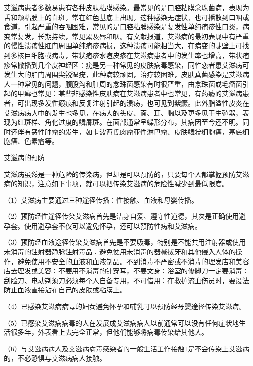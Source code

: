 \documentclass[12pt,UTF8]{ctexbook}
\begin{document}
艾滋病患者多数易患有各种皮肤粘膜感染。最常见的是口腔粘膜念珠菌病，表现为舌和颊粘膜上的白斑，常在红色基底上出现，这种感染无症状，也可播散到口咽或食道，引起严重的吞咽困难，常见的是口腔粘膜感染是复发性单纯疱疹性口炎，病变常复发，长期持续，常见累及唇和咽。有文献报道，艾滋病的最初表现中有严重的慢性溃疡性肛门周围单纯疱疹病损，这种溃疡可能相当大，在病变的陡壁上可找到多核巨细胞或病毒，带状疱疹水痘皮疹在艾滋病患者中的发生率也增高，带状疱疹常撒播到几个皮神经区：疣是另一种常见的皮肤病毒感染，同性恋者患艾滋病可发生大的肛门周围尖锐湿疣，此种病较顽固，治疗较困难，皮肤真菌感染是艾滋病人一种常见的问题，腹股沟和肛周的念珠菌感染有时很严重，由念珠菌或毛癣菌引起的甲癣也常见：某些非感染性皮肤病在艾滋病患者中也常见，有药瘾的艾滋病患者，可出现多发性瘢痕和反复注射引起的溃疡，也可见到紫癜。此外脂溢性皮炎在艾滋病病人中的发生也多见，在病人的头皮、面、耳、胸以及更多见于生殖器，表现为红斑样、角化过度的鳞屑斑。在面部通常呈蝶形分布，其病因至今还不明。同时还伴有恶性肿瘤的发生，如卡波西氏肉瘤亚性淋巴瘤、皮肤鳞状细胞癌，基底细胞癌、色素瘤等。





艾滋病的预防


艾滋病虽然是一种危险的传染病，但却是可以预防的，只要每个人都掌握预防艾滋病的知识，注意如下事项，就可以把传染艾滋病的危险性减少到最低限度。

（1）艾滋病主要通过三种途径传播：性接触、血液和母婴传播。

（2）预防经性途径传染艾滋病首先是洁身自爱、遵守性道德，其次是正确使用避孕套。使用避孕套不仅可以避免怀孕，还可以预防性病和艾滋病。

（3）预防经血液途径传染艾滋病首先是不要吸毒，特别是不能共用注射器或使用未消毒的注射器静脉注射毒品：避免使用未消毒的器械拔牙和其他侵入人体的操作，避免使用不安全的血液和血液制品。不到消毒不严密或不消毒的理发店和美容店去理发或美容：不要用不消毒的针穿耳，不要文身：浴室的修脚刀一定要消毒：刮脸刀、电动剃须刀必须每个人自备专用，不可借用：在救护流血伤员时，要设法防止血液直接沾在自己的皮肤或粘膜上。

（4）已感染艾滋病病毒的妇女避免怀孕和哺乳可以预防经母婴途径传染艾滋病。

（5）已感染艾滋病病毒的人在发展成艾滋病病人以前通常可以没有任何症状地生活很多年，外表看上去完全正常，但他们能够将病毒传染给其他人。

（6）与艾滋病病人及艾滋病病毒感染者的一般生活工作接触1是不会传染上艾滋病的，不必恐惧与艾滋病病人接触。
\end{document}
